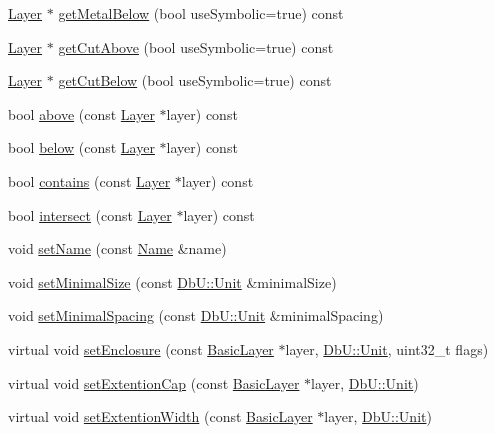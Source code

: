 \begin{DoxyCompactItemize}
\item 
\hyperlink{classHurricane_1_1Layer}{Layer} $\ast$ \hyperlink{classHurricane_1_1Layer_a4bc8358f67c1a1a9b2581e4b3732108c}{get\+Metal\+Below} (bool use\+Symbolic=true) const
\item 
\hyperlink{classHurricane_1_1Layer}{Layer} $\ast$ \hyperlink{classHurricane_1_1Layer_ad9fca94fed1837e3e80e9b6445822b7d}{get\+Cut\+Above} (bool use\+Symbolic=true) const
\item 
\hyperlink{classHurricane_1_1Layer}{Layer} $\ast$ \hyperlink{classHurricane_1_1Layer_a983956c8127688390f978cc5bd0d768d}{get\+Cut\+Below} (bool use\+Symbolic=true) const
\item 
bool \hyperlink{classHurricane_1_1Layer_abbd13bf66cf75dd6445d0353987119f3}{above} (const \hyperlink{classHurricane_1_1Layer}{Layer} $\ast$layer) const
\item 
bool \hyperlink{classHurricane_1_1Layer_a090f8697946f721351a626052af25027}{below} (const \hyperlink{classHurricane_1_1Layer}{Layer} $\ast$layer) const
\item 
bool \hyperlink{classHurricane_1_1Layer_af63dd0a48e2a3514a1cdaccd4586bad8}{contains} (const \hyperlink{classHurricane_1_1Layer}{Layer} $\ast$layer) const
\item 
bool \hyperlink{classHurricane_1_1Layer_adbea0bafaa87b033efdaa98bf2709182}{intersect} (const \hyperlink{classHurricane_1_1Layer}{Layer} $\ast$layer) const
\item 
void \hyperlink{classHurricane_1_1Layer_ab93809f19bc360f58d35e91438ef2f87}{set\+Name} (const \hyperlink{classHurricane_1_1Name}{Name} \&name)
\item 
void \hyperlink{classHurricane_1_1Layer_a400d17fe999c0080bb50489948986fe7}{set\+Minimal\+Size} (const \hyperlink{group__DbUGroup_ga4fbfa3e8c89347af76c9628ea06c4146}{Db\+U\+::\+Unit} \&minimal\+Size)
\item 
void \hyperlink{classHurricane_1_1Layer_a81a8a24526e8535fba5a35cdcc194a8f}{set\+Minimal\+Spacing} (const \hyperlink{group__DbUGroup_ga4fbfa3e8c89347af76c9628ea06c4146}{Db\+U\+::\+Unit} \&minimal\+Spacing)
\item 
virtual void \hyperlink{classHurricane_1_1Layer_a04e9c983525d074508d7e10107c1c3c7}{set\+Enclosure} (const \hyperlink{classHurricane_1_1BasicLayer}{Basic\+Layer} $\ast$layer, \hyperlink{group__DbUGroup_ga4fbfa3e8c89347af76c9628ea06c4146}{Db\+U\+::\+Unit}, uint32\+\_\+t flags)
\item 
virtual void \hyperlink{classHurricane_1_1Layer_a55c7b39e000442ea36a0774d26b7fbde}{set\+Extention\+Cap} (const \hyperlink{classHurricane_1_1BasicLayer}{Basic\+Layer} $\ast$layer, \hyperlink{group__DbUGroup_ga4fbfa3e8c89347af76c9628ea06c4146}{Db\+U\+::\+Unit})
\item 
virtual void \hyperlink{classHurricane_1_1Layer_a7a6943dbcb3403aff34056cd5de00e66}{set\+Extention\+Width} (const \hyperlink{classHurricane_1_1BasicLayer}{Basic\+Layer} $\ast$layer, \hyperlink{group__DbUGroup_ga4fbfa3e8c89347af76c9628ea06c4146}{Db\+U\+::\+Unit})
\end{DoxyCompactItemize}


